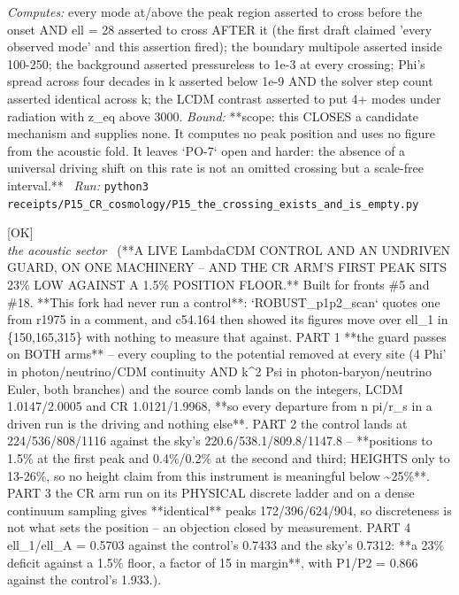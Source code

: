 \begin{description}
\emph{Computes:} every mode at/above the peak region asserted to cross before the onset AND ell = 28 asserted to cross AFTER it (the first draft claimed 'every observed mode' and this assertion fired); the boundary multipole asserted inside 100-250; the background asserted pressureless to 1e-3 at every crossing; Phi's spread across four decades in k asserted below 1e-9 AND the solver step count asserted identical across k; the LCDM contrast asserted to put 4+ modes under radiation with z\_eq above 3000.
 \emph{Bound:} **scope: this CLOSES a candidate mechanism and supplies none. It computes no peak position and uses no figure from the acoustic fold. It leaves `PO-7` open and harder: the absence of a universal driving shift on this rate is not an omitted crossing but a scale-free interval.**
\ \emph{Run:} \texttt{python3 receipts/P15\_CR\_cosmology/P15\_the\_crossing\_exists\_and\_is\_empty.py}
\item[\label{rcpt:P15_two_arm_control_and_guard}\texttt{P15\_two\_arm\_control\_and\_guard}]\hfill\textsf{[OK]}\\
\textit{the acoustic sector} \ (**A LIVE LambdaCDM CONTROL AND AN UNDRIVEN GUARD, ON ONE MACHINERY -- AND THE CR ARM'S FIRST PEAK SITS 23\% LOW AGAINST A 1.5\% POSITION FLOOR.** Built for fronts \#5 and \#18. **This fork had never run a control**: `ROBUST\_p1p2\_scan` quotes one from r1975 in a comment, and c54.164 then showed its figures move over ell\_1 in \{150,165,315\} with nothing to measure that against. PART 1 **the guard passes on BOTH arms** -- every coupling to the potential removed at every site (4 Phi' in photon/neutrino/CDM continuity AND k\textasciicircum{}2 Psi in photon-baryon/neutrino Euler, both branches) and the source comb lands on the integers, LCDM 1.0147/2.0005 and CR 1.0121/1.9968, **so every departure from n pi/r\_s in a driven run is the driving and nothing else**. PART 2 the control lands at 224/536/808/1116 against the sky's 220.6/538.1/809.8/1147.8 -- **positions to 1.5\% at the first peak and 0.4\%/0.2\% at the second and third; HEIGHTS only to 13-26\%, so no height claim from this instrument is meaningful below \textasciitilde{}25\%**. PART 3 the CR arm run on its PHYSICAL discrete ladder and on a dense continuum sampling gives **identical** peaks 172/396/624/904, so discreteness is not what sets the position -- an objection closed by measurement. PART 4 ell\_1/ell\_A = 0.5703 against the control's 0.7433 and the sky's 0.7312: **a 23\% deficit against a 1.5\% floor, a factor of 15 in margin**, with P1/P2 = 0.866 against the control's 1.933.). 

\end{description}
